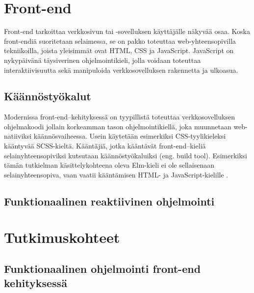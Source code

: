 \section{Front-end}
Front-end tarkoittaa verkkosivun tai -sovelluksen käyttäjälle näkyvää osaa. Koska front-endiä suoritetaan selaimessa,
se on pakko toteuttaa web-yhteensopivilla tekniikoilla, joista yleisimmät ovat HTML, CSS ja JavaScript. JavaScript on
nykypäivänä täysiverinen ohjelmointikieli, jolla voidaan toteuttaa interaktiivisuutta sekä manipuloida verkkosovelluksen
rakennetta ja ulkoasua. \cite{fullstackdeveloper}

\subsection{Käännöstyökalut}
Modernissa front-end–kehityksessä on tyypillistä toteuttaa verkkosovelluksen ohjelmakoodi jollain korkeamman tason
ohjelmointikiellä, joka muunnetaan web-natiiviksi käännösvaiheessa. Usein käytetään esimerkiksi CSS-tyylikieleksi
kääntyvää SCSS-kieltä. Kääntäjiä, jotka kääntävät front-end–kieliä selainyhteensopiviksi kutsutaan käännöstyökaluiksi
(eng. build tool). Esimerkiksi tämän tutkielman käsittelykohteena oleva Elm-kieli ei ole sellaisenaan
selainyhteensopiva, vaan vaatii kääntämisen HTML- ja JavaScript-kielille \cite{elmlang}. \cite{fullstackdeveloper}


\subsection{Funktionaalinen reaktiivinen ohjelmointi}

\section{Tutkimuskohteet}

\subsection{Funktionaalinen ohjelmointi front-end kehityksessä}
